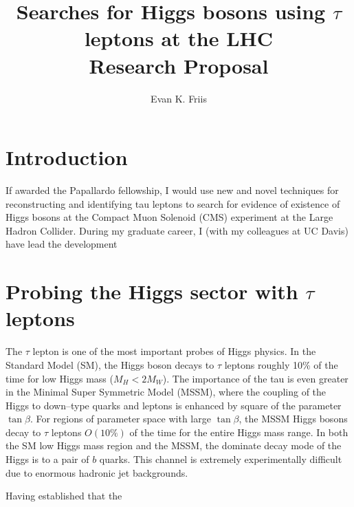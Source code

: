 \documentclass[a4paper,11pt,oneside]{article}
\title{Searches for Higgs bosons using $\tau$ leptons at the LHC\\
Research Proposal}
\author{Evan K. Friis}
\begin{document}
  \maketitle

  \section{Introduction}
  If awarded the Papallardo fellowship, I would use new and novel
  techniques for reconstructing and identifying tau leptons to search for evidence of existence of Higgs
  bosons at the Compact Muon Solenoid (CMS) experiment at the Large Hadron
  Collider.  
  During my graduate career, I (with my colleagues at UC Davis) have
  lead the development 

  \section{Probing the Higgs sector with $\tau$ leptons} The $\tau$ lepton is
  one of the most important probes of Higgs physics.  In the Standard Model
  (SM), the Higgs boson decays to $\tau$ leptons roughly 10\% of the time for
  low Higgs mass ($M_H < 2M_W$).  The importance of the tau is even greater in
  the Minimal Super Symmetric Model (MSSM), where the coupling of the Higgs to
  down--type quarks and leptons is enhanced by square of the parameter
  $\tan\beta$.  For regions of parameter space with large $\tan\beta$, the MSSM
  Higgs bosons decay to $\tau$ leptons $O(10\%)$ of the time for the entire
  Higgs mass range.  In both the SM low Higgs mass region and the MSSM, the
  dominate decay mode of the Higgs is to a pair of $b$ quarks.  This channel is
  extremely experimentally difficult due to enormous hadronic jet backgrounds.

  Having established that the 
\end{document}
